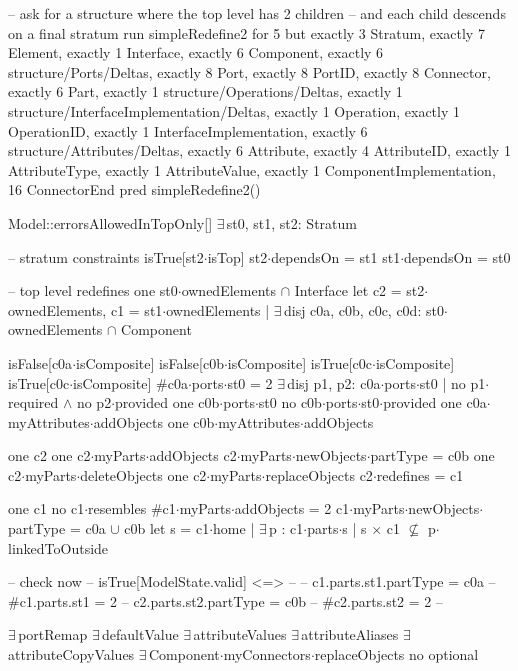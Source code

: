 -- ask for a structure where the top level has 2 children
-- and each child descends on a final stratum
run simpleRedefine2 for 5
  but exactly 3 Stratum, exactly 7 Element,
  exactly 1 Interface, exactly 6 Component,
  exactly 6 structure/Ports/Deltas, exactly 8 Port, exactly 8 PortID,
  exactly 8 Connector, exactly 6 Part,
  exactly 1 structure/Operations/Deltas,
  exactly 1 structure/InterfaceImplementation/Deltas,
  exactly 1 Operation, exactly 1 OperationID, exactly 1 InterfaceImplementation,
  exactly 6 structure/Attributes/Deltas, exactly 6 Attribute, exactly 4 AttributeID,
  exactly 1 AttributeType, exactly 1 AttributeValue, exactly 1 ComponentImplementation, 16 ConnectorEnd
pred simpleRedefine2()
{
  Model::errorsAllowedInTopOnly[]
  $\exists\,$st0, st1, st2: Stratum
  {
    -- stratum constraints
    isTrue[st2$\cdot$isTop]
    st2$\cdot$dependsOn = st1
    st1$\cdot$dependsOn = st0

    -- top level redefines
    one st0$\cdot$ownedElements $\cap$ Interface
    let
      c2 = st2$\cdot$ownedElements,
      c1 = st1$\cdot$ownedElements |
    $\exists\,$disj c0a, c0b, c0c, c0d: st0$\cdot$ownedElements $\cap$ Component
    {
      isFalse[c0a$\cdot$isComposite]
      isFalse[c0b$\cdot$isComposite]
      isTrue[c0c$\cdot$isComposite]
      isTrue[c0c$\cdot$isComposite]
      #c0a$\cdot$ports$\cdot$st0 = 2
      $\exists\,$disj p1, p2: c0a$\cdot$ports$\cdot$st0 |
        no p1$\cdot$required $\wedge$ no p2$\cdot$provided
      one c0b$\cdot$ports$\cdot$st0
      no c0b$\cdot$ports$\cdot$st0$\cdot$provided
      one c0a$\cdot$myAttributes$\cdot$addObjects
      one c0b$\cdot$myAttributes$\cdot$addObjects
      
      one c2
      one c2$\cdot$myParts$\cdot$addObjects
      c2$\cdot$myParts$\cdot$newObjects$\cdot$partType = c0b
      one c2$\cdot$myParts$\cdot$deleteObjects
      one c2$\cdot$myParts$\cdot$replaceObjects
      c2$\cdot$redefines = c1
      
      one c1
      no c1$\cdot$resembles
      #c1$\cdot$myParts$\cdot$addObjects = 2
      c1$\cdot$myParts$\cdot$newObjects$\cdot$partType = c0a $\cup$ c0b
      let s = c1$\cdot$home |
      $\exists\,$p : c1$\cdot$parts$\cdot$s |
        s$\,\times\,$c1 $\not\subseteq$ p$\cdot$linkedToOutside
      
      -- check now
--      isTrue[ModelState.valid] <=>
--      {
--        c1.parts.st1.partType = c0a
--        #c1.parts.st1 = 2
--        c2.parts.st2.partType = c0b
--        #c2.parts.st2 = 2
--      }
    }
  }

  $\exists\,$portRemap
  $\exists\,$defaultValue
  $\exists\,$attributeValues
  $\exists\,$attributeAliases
  $\exists\,$attributeCopyValues
  $\exists\,$Component$\cdot$myConnectors$\cdot$replaceObjects
  no optional
}

